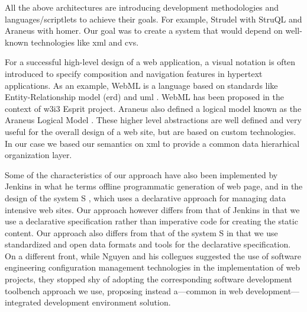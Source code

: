 \documentclass{elsart}
\begin{document}
All the above architectures are introducing development methodologies and languages/scriptlets to achieve their goals. For example, Strudel with StruQL
and Araneus with homer. Our goal was to create a system
that would depend on well-known technologies like {\sc xml} and {\sc cvs}.

For a successful high-level design of a web application,
a visual notation is often introduced to specify composition and navigation features in
hypertext applications.
As an example, {\sc WebML} \cite{CFB00,WEBML} is a language based on standards like Entity-Relationship model {\sc (erd)} and {\sc uml} \cite{UML}.
{\sc WebML} has been proposed in the context of {\sc w3i3} Esprit project.
Araneus also defined a logical model known as the Araneus Logical Model \cite{MAM03}.
These higher level abstractions are well defined and very useful for the overall design of a web site, but are based on custom technologies.
In our case we based our semantics on {\sc xml} to provide a common data hierarhical organization layer.

Some of the characteristics of our approach have also been implemented by
Jenkins \cite{Jen04} in what he terms
offline programmatic generation of web page, and in the design
of the system S \cite{SCK02}, which uses a
declarative approach for managing data intensive web sites.
Our approach however differs from that of Jenkins
in that we use a declarative specification
rather than imperative code for creating the static content.
Our approach also differs from that of the system S in that
we use standardized and open data formats and tools for the
declarative specification.
On a different front, while Nguyen and his collegues \cite{NMT04}
suggested the use of software engineering configuration management technologies
in the implementation of web projects, they stopped shy of adopting
the corresponding software development toolbench approach we use,
proposing instead a---common in web development---integrated
development environment solution.
\end{document}
